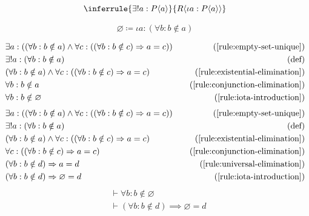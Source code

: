 \begin{foundation}
    \begin{equation}
        \inferrule{\exists! a: P\bound{a}}{R\bound{\iota a: P\bound{a}}}
        \label{rule:iota-introduction}
    \end{equation}%
\end{foundation}

\begin{notation}
    \[\varnothing \coloneqq \iota a: (\forall b: b \notin a)\]
\end{notation}

\begin{align*}
    & \hspace{0em} \exists a: ((\forall b: b \notin a) \wedge \forall c: ((\forall b: b \notin c) \Rightarrow a = c)) & \quad (\text{\ref{rule:empty-set-unique}})\\
    & \hspace{0em} \exists! a: (\forall b: b \notin a) & \quad (\text{def})\\
    & \hspace{0em} (\forall b: b \notin a) \wedge \forall c: ((\forall b: b \notin c) \Rightarrow a = c) & \quad (\text{\ref{rule:existential-elimination}})\\
    & \hspace{0em} \forall b: b \notin a & \quad (\text{\ref{rule:conjunction-elimination}})\\
    & \hspace{0em} \forall b: b \notin \varnothing & \quad (\text{\ref{rule:iota-introduction}})
\end{align*}
\begin{align*}
    & \hspace{0em} \exists a: ((\forall b: b \notin a) \wedge \forall c: ((\forall b: b \notin c) \Rightarrow a = c)) & \quad (\text{\ref{rule:empty-set-unique}})\\
    & \hspace{0em} \exists! a: (\forall b: b \notin a) & \quad (\text{def})\\
    & \hspace{0em} (\forall b: b \notin a) \wedge \forall c: ((\forall b: b \notin c) \Rightarrow a = c) & \quad (\text{\ref{rule:existential-elimination}})\\
    & \hspace{0em} \forall c: ((\forall b: b \notin c) \Rightarrow a = c) & \quad (\text{\ref{rule:conjunction-elimination}})\\
    & \hspace{0em} (\forall b: b \notin d) \Rightarrow a = d & \quad (\text{\ref{rule:universal-elimination}})\\
    & \hspace{0em} (\forall b: b \notin d) \Rightarrow \varnothing = d & \quad (\text{\ref{rule:iota-introduction}})
\end{align*}
\begin{align}
    &\vdash \forall b: b \notin \varnothing \label{rule:empty-set}\\
    &\vdash (\forall b: b \notin d) \implies \varnothing = d \label{rule:empty-set}
\end{align}
